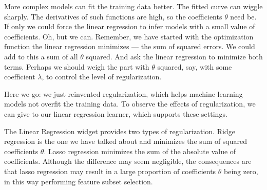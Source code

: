 
More complex models can fit the training data better. The fitted curve can wiggle sharply. The derivatives of such functions are high, so the coefficients $\theta$ need be. If only we could force the linear regression to infer models with a small value of coefficients. Oh, but we can. Remember, we have started with the optimization function the linear regression minimizes — the sum of squared errors. We could add to this a sum of all $\theta$ squared. And ask the linear regression to minimize both terms. Perhaps we should weigh the part with $\theta$ squared, say, with some coefficient $\lambda$, to control the level of regularization.

Here we go: we just reinvented regularization, which helps machine learning models not overfit the training data. To observe the effects of regularization, we can give  to our linear regression learner, which supports these settings.

\newpage

The Linear Regression widget provides two types of regularization.  Ridge regression is the one we have talked about and minimizes the sum of squared coefficients $\theta$. Lasso regression minimizes the sum of the absolute value of coefficients. Although the difference may seem negligible, the consequences are that lasso regression may result in a large proportion of coefficients $\theta$ being zero, in this way performing feature subset selection.

